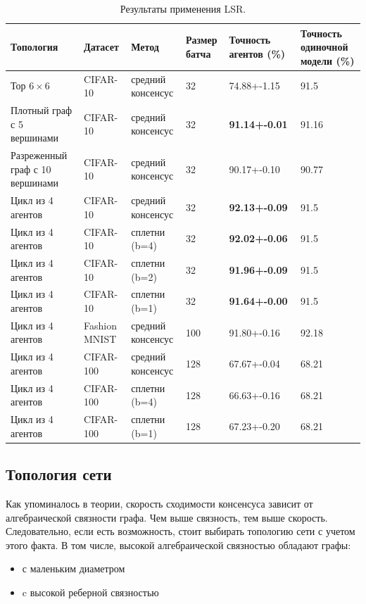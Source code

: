 \documentclass[a4paper,article,14pt]{extarticle}
\begin{document}
\begin{center}
    \begin{longtable}{|p{3cm}|p{2cm}|p{2.2cm}|p{1.8cm}|p{2cm}|p{2.7cm}|}
    \caption{Результаты применения LSR.}
    \label{table:lsr}\\
    \hline
    \textbf{Топология} & \textbf{Датасет} & \textbf{Метод} & \textbf{Размер батча} & \textbf{Точность агентов (\%)} & \textbf{Точность одиночной модели (\%)} \\
    \hline
    Тор $6\times 6$  & CIFAR-10 & средний консенсус& 32 & 74.88+-1.15 & 91.5\\
    \hline
    Плотный граф с 5 вершинами& CIFAR-10 & средний консенсус& 32 & \textbf{91.14+-0.01} & 91.16\\
    \hline
    Разреженный граф с 10 вершинами& CIFAR-10 & средний консенсус& 32 & 90.17+-0.10 & 90.77\\
    \hline
    Цикл из 4 агентов& CIFAR-10 & средний консенсус& 32 & \textbf{92.13+-0.09} & 91.5\\
    \hline
    Цикл из 4 агентов& CIFAR-10 & сплетни (b=4)& 32 & \textbf{92.02+-0.06} & 91.5\\
    \hline
    Цикл из 4 агентов& CIFAR-10 & сплетни (b=2)& 32 & \textbf{91.96+-0.09} & 91.5\\
    \hline
    Цикл из 4 агентов& CIFAR-10 & сплетни (b=1)& 32 & \textbf{91.64+-0.00} & 91.5\\
    \hline
    Цикл из 4 агентов& Fashion MNIST & средний консенсус & 100 & 91.80+-0.16 & 92.18\\
    \hline
    Цикл из 4 агентов& CIFAR-100  & средний консенсус& 128 & 67.67+-0.04 & 68.21\\
    \hline
    Цикл из 4 агентов& CIFAR-100  & сплетни (b=4)& 128 & 66.63+-0.16 & 68.21\\
    \hline
    Цикл из 4 агентов& CIFAR-100  & сплетни (b=1)& 128 & 67.23+-0.20 & 68.21\\
    \hline
    \end{longtable}
\end{center}

\subsection{Топология сети}
\label{section:topology}
Как упоминалось в теории, скорость сходимости консенсуса зависит от алгебраической связности графа. Чем выше связность, тем выше скорость. Следовательно, если есть возможность, стоит выбирать топологию сети с учетом этого факта. В том числе, высокой алгебраической связностью обладают графы:
\begin{itemize}
    \item с маленьким диаметром
    \item c высокой реберной связностью
\end{itemize}
\end{document}
